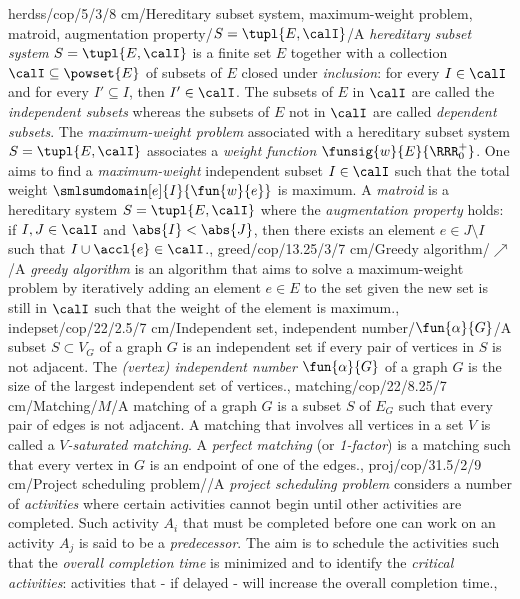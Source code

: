 herdss/cop/5/3/8 cm/{Hereditary subset system, maximum-weight problem, matroid, augmentation property}/{$S=\tupl{E,\calI}$}/{A \emph{hereditary subset system} $S=\tupl{E,\calI}$ is a finite set $E$ together with a collection $\calI\subseteq\powset{E}$ of subsets of $E$ closed under \emph{inclusion}: for every $I\in\calI$ and for every $I'\subseteq I$, then $I'\in\calI$. The subsets of $E$ in $\calI$ are called the \emph{independent subsets} whereas the subsets of $E$ not in $\calI$ are called \emph{dependent subsets}. The \emph{maximum-weight problem} associated with a hereditary subset system $S=\tupl{E,\calI}$ associates a \emph{weight function} $\funsig{w}{E}{\RRR^+_0}$. One aims to find a \emph{maximum-weight} independent subset $I\in\calI$ such that the total weight $\smlsumdomain[e]{I}{\fun{w}{e}}$ is maximum. A \emph{matroid} is a hereditary system $S=\tupl{E,\calI}$ where the \emph{augmentation property} holds: if $I,J\in\calI$ and $\abs{I}<\abs{J}$, then there exists an element $e\in J\setminus I$ such that $I\cup\accl{e}\in\calI$.},
greed/cop/13.25/3/7 cm/{Greedy algorithm}/{\textdollaroldstyle$\nearrow$}/{A \emph{greedy algorithm} is an algorithm that aims to solve a maximum-weight problem by iteratively adding an element $e\in E$ to the set given the new set is still in $\calI$ such that the weight of the element is maximum.},%
indepset/cop/22/2.5/7 cm/{Independent set, independent number}/{$\fun{\alpha}{G}$}/{A subset $S\subset V_G$ of a graph $G$ is an independent set if every pair of vertices in $S$ is not adjacent. The \emph{(vertex) independent number} $\fun{\alpha}{G}$ of a graph $G$ is the size of the largest independent set of vertices.},
matching/cop/22/8.25/7 cm/{Matching}/{$M$}/{A matching of a graph $G$ is a subset $S$ of $E_G$ such that every pair of edges is not adjacent. A matching that involves all vertices in a set $V$ is called a \emph{$V$-saturated matching}. A \emph{perfect matching} (or \emph{1-factor}) is a matching such that every vertex in $G$ is an endpoint of one of the edges.},
proj/cop/31.5/2/9 cm/{Project scheduling problem}/{\clock}/{A \emph{project scheduling problem} considers a number of \emph{activities} where certain activities cannot begin until other activities are completed. Such activity $A_i$ that must be completed before one can work on an activity $A_j$ is said to be a \emph{predecessor}. The aim is to schedule the activities such that the \emph{overall completion time} is minimized and to identify the \emph{critical activities}: activities that - if delayed - will increase the overall completion time.},
